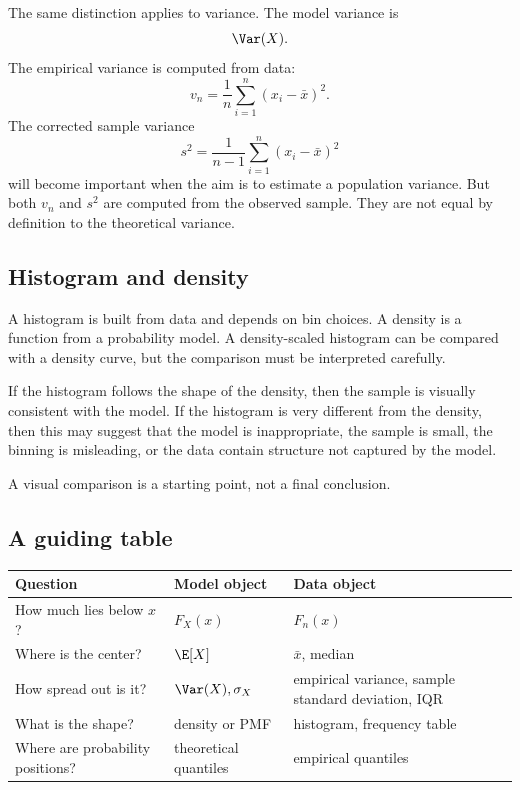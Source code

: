 The same distinction applies to variance. The model variance is
\[
\Var(X).
\]
The empirical variance is computed from data:
\[
v_n=\frac1n\sum_{i=1}^n(x_i-\bar{x})^2.
\]
The corrected sample variance
\[
s^2=\frac1{n-1}\sum_{i=1}^n(x_i-\bar{x})^2
\]
will become important when the aim is to estimate a population variance. But both
\(v_n\) and \(s^2\) are computed from the observed sample. They are not equal by
definition to the theoretical variance.

\subsection*{Histogram and density}

A histogram is built from data and depends on bin choices. A density is a
function from a probability model. A density-scaled histogram can be compared
with a density curve, but the comparison must be interpreted carefully.

If the histogram follows the shape of the density, then the sample is visually
consistent with the model. If the histogram is very different from the density,
then this may suggest that the model is inappropriate, the sample is small, the
binning is misleading, or the data contain structure not captured by the model.

A visual comparison is a starting point, not a final conclusion.

\subsection*{A guiding table}

\begin{center}
\begin{tabular}{lll}
\toprule
Question & Model object & Data object \\
\midrule
How much lies below \(x\)? & \(F_X(x)\) & \(F_n(x)\) \\
Where is the center? & \(\E[X]\) & \(\bar{x}\), median \\
How spread out is it? & \(\Var(X),\sigma_X\) & empirical variance, sample standard deviation, IQR \\
What is the shape? & density or PMF & histogram, frequency table \\
Where are probability positions? & theoretical quantiles & empirical quantiles \\
\bottomrule
\end{tabular}
\end{center}

